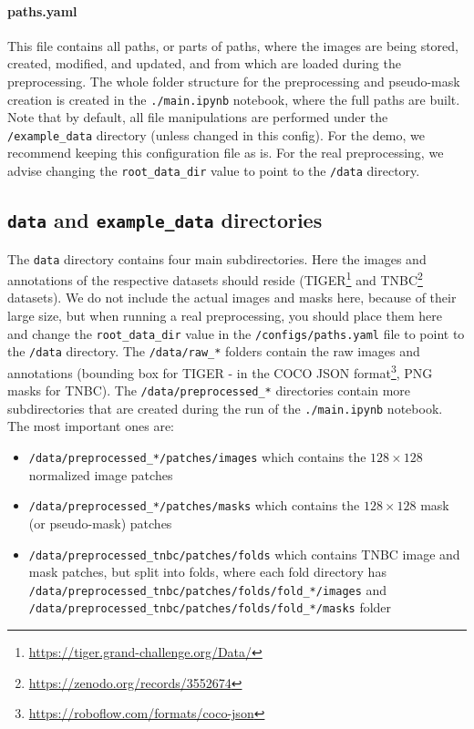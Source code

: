 \paragraph{paths.yaml}
This file contains all paths, or parts of paths, where the images are
being stored, created, modified, and updated, and from which are loaded
during the preprocessing. The whole folder structure for the
preprocessing and pseudo-mask creation is created in the
\texttt{./main.ipynb} notebook, where the full paths are built. Note that by default, all file manipulations are performed under
the \texttt{/example\_data} directory (unless changed in this config).
For the demo, we recommend keeping this
configuration file as is. For the real preprocessing, we advise changing the
\texttt{root\_data\_dir} value to point to the \texttt{/data} directory.

\subsection{\texttt{data} and \texttt{example\_data} directories}\label{data-and-example_data-directories}

The \texttt{data} directory contains four main subdirectories. Here the
images and annotations of the respective datasets should reside
(TIGER\footnote{\url{https://tiger.grand-challenge.org/Data/}} and TNBC\footnote{\url{https://zenodo.org/records/3552674}} datasets). We do not include the actual images and masks here, because of their large size, but when running a real preprocessing, you should place them here and change the \texttt{root\_data\_dir} value in the \texttt{/configs/paths.yaml} file to point to the \texttt{/data} directory. The
\texttt{/data/raw\_*} folders contain the raw images and annotations
(bounding box for TIGER - in the COCO JSON format\footnote{\url{https://roboflow.com/formats/coco-json}}, PNG
masks for TNBC). The \texttt{/data/preprocessed\_*} directories contain
more subdirectories that are created during the run of the
\texttt{./main.ipynb} notebook. The most important ones are:

\begin{itemize}
\item
  \texttt{/data/preprocessed\_*/patches/images} which contains the
  $128\!\times\!128$ normalized image patches
\item
  \texttt{/data/preprocessed\_*/patches/masks} which contains the
  $128\!\times\!128$ mask (or pseudo-mask) patches
\item
  \texttt{/data/preprocessed\_tnbc/patches/folds} which contains TNBC
  image and mask patches, but split into folds, where each fold directory
  has \\
  \texttt{/data/preprocessed\_tnbc/patches/folds/fold\_*/images} and \\
  \texttt{/data/preprocessed\_tnbc/patches/folds/fold\_*/masks} folder
\end{itemize}

